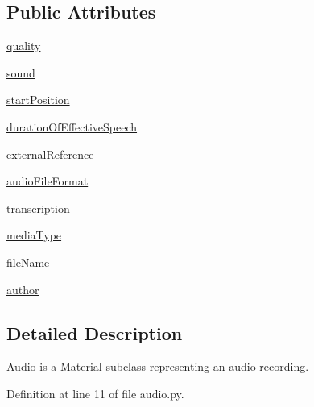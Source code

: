 \subsection*{Public Attributes}
\begin{DoxyCompactItemize}
\item 
\hyperlink{classlmf_1_1src_1_1resources_1_1audio_1_1_audio_a7ece3b242eefb9b0da1f5cac2a5a0859}{quality}
\item 
\hyperlink{classlmf_1_1src_1_1resources_1_1audio_1_1_audio_a18d7a7940c8b55db6dbcbe64559cf68c}{sound}
\item 
\hyperlink{classlmf_1_1src_1_1resources_1_1audio_1_1_audio_a5ff81f6d9d1f1d078a067f73594758f4}{start\+Position}
\item 
\hyperlink{classlmf_1_1src_1_1resources_1_1audio_1_1_audio_ad1640839eb1c58ca5ef9796eb7c0f559}{duration\+Of\+Effective\+Speech}
\item 
\hyperlink{classlmf_1_1src_1_1resources_1_1audio_1_1_audio_acedec7cf6764d262298924f7deb0841a}{external\+Reference}
\item 
\hyperlink{classlmf_1_1src_1_1resources_1_1audio_1_1_audio_a23a0ad9fcab348d29b306dd0c5f65736}{audio\+File\+Format}
\item 
\hyperlink{classlmf_1_1src_1_1resources_1_1audio_1_1_audio_ab8d1f2cfa0f42732f123177df3b56849}{transcription}
\item 
\hyperlink{classlmf_1_1src_1_1resources_1_1audio_1_1_audio_ab970a26a0799523765c3748dd1f39816}{media\+Type}
\item 
\hyperlink{classlmf_1_1src_1_1resources_1_1audio_1_1_audio_a6552cf441bc8d9a7d7e30e20800761ac}{file\+Name}
\item 
\hyperlink{classlmf_1_1src_1_1resources_1_1audio_1_1_audio_a3f62581c092b3011a2c6a70928ae8c0a}{author}
\end{DoxyCompactItemize}


\subsection{Detailed Description}
\hyperlink{classlmf_1_1src_1_1resources_1_1audio_1_1_audio}{Audio} is a Material subclass representing an audio recording. 

Definition at line 11 of file audio.\+py.




